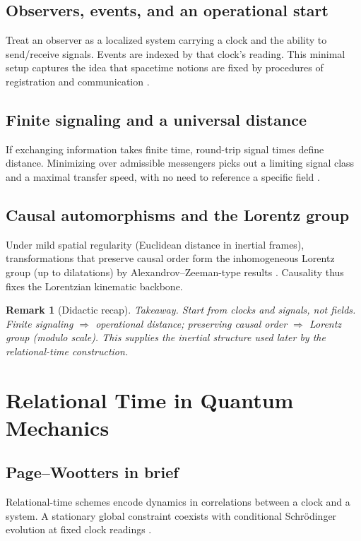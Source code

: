 \documentclass[11pt,a4paper]{article}
\theoremstyle{thmstyleone}
\theoremstyle{thmstyletwo}
\newtheorem{remark}{Remark}
\theoremstyle{thmstylethree}
\begin{document}
    \subsection{Observers, events, and an operational start}\label{subsec:observers}
        Treat an observer as a localized system carrying a clock and the ability to send/receive signals. Events are indexed by that clock’s reading. This minimal setup captures the idea that spacetime notions are fixed by procedures of registration and communication \cite{Pineda2026}.

    \subsection{Finite signaling and a universal distance}\label{subsec:distance}
        If exchanging information takes finite time, round-trip signal times define distance. Minimizing over admissible messengers picks out a limiting signal class and a maximal transfer speed, with no need to reference a specific field \cite{Pineda2026}.

    \subsection{Causal automorphisms and the Lorentz group}\label{subsec:lorentz}
        Under mild spatial regularity (Euclidean distance in inertial frames), transformations that preserve causal order form the inhomogeneous Lorentz group (up to dilatations) by Alexandrov–Zeeman-type results \cite{Zeeman1964}. Causality thus fixes the Lorentzian kinematic backbone.

        \begin{remark}[Didactic recap]
            \emph{Takeaway.} Start from clocks and signals, not fields. Finite signaling $\Rightarrow$ operational distance; preserving causal order $\Rightarrow$ Lorentz group (modulo scale). This supplies the inertial structure used later by the relational-time construction.
        \end{remark}

    \section{Relational Time in Quantum Mechanics}\label{sec:relationaltime}

    \subsection{Page--Wootters in brief}\label{subsec:pw}
        Relational-time schemes encode dynamics in correlations between a clock and a system. A stationary global constraint coexists with conditional Schrödinger evolution at fixed clock readings \cite{PageWootters1983,Wootters1984,DeWitt1967}.
\end{document}
